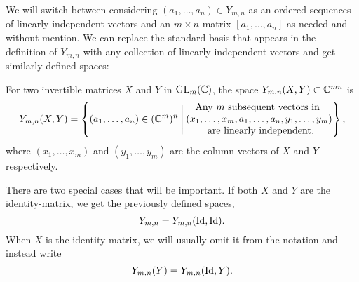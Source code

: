 We will switch between considering $(a_1,\dots,a_n)\in Y_{m,n}$ as an
ordered sequences of linearly independent vectors and an $m\times n$
matrix $[a_1,\dots,a_n]$ as needed and without mention. We can replace
the standard basis that appears in the definition of $Y_{m,n}$ with
any collection of linearly independent vectors and get similarly
defined spaces: 
\begin{definition}
  \label{def:rum}
  For two invertible matrices $X$ and $Y$ in
  $\operatorname{GL}_m(\mathbb{C})$, the space \newline
  $Y_{m,n}(X,Y) \subset \mathbb{C}^{mn}$ is
  \[ Y_{m,n}(X,Y) = \left\{ (a_1,\dots,a_n) \in (\mathbb{C}^m)^n
    \:\Bigg\vert\: 
    \begin{matrix}
      \text{Any } m \text{ subsequent vectors in } \\
      (x_1,\dots,x_m,a_1,\dots,a_n,y_1,\dots,y_m) \\
      \text{ are linearly independent.}
    \end{matrix}  \right\}, \]
  where $(x_1,\dots,x_m)$ and $(y_1,\dots,y_m)$ are the column vectors
  of $X$ and $Y$ respectively.
  
  There are two special cases that will be important.
  If both $X$ and $Y$ are the identity-matrix, we get the previously
  defined spaces,
  \[ Y_{m,n} = Y_{m,n}(\operatorname{Id},\operatorname{Id}). \]
  When $X$ is the identity-matrix, we will usually omit it from the
  notation and instead write
  \[ Y_{m,n}(Y) = Y_{m,n}(\operatorname{Id},Y). \]
\end{definition}

